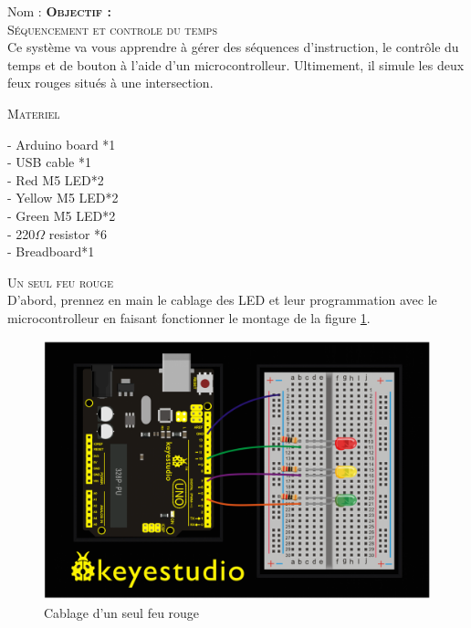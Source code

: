 \documentclass[a4paper, 11pt]{article}           %
\newcommand{\objectif}[1]{\textsc{\huge \textbf{Objectif :}\\[2mm] #1} }
\newcommand{\partie}[1]{\textsc{\LARGE #1} }
\begin{document}
\sffamily
\hfill Nom : {\noindent\makebox[5cm]{\dotfill}\endgraf}
\objectif{Séquencement et controle du temps}\\

Ce système va vous apprendre à gérer des séquences d'instruction, le contrôle du temps et de bouton à l'aide d'un microcontrolleur. Ultimement, il simule les deux feux rouges situés à une intersection.

\bigskip


\partie{Materiel}                         %
\begin{multicols}{2}
- Arduino board *1\\
- USB cable *1\\
- Red M5 LED*2\\
- Yellow M5 LED*2\\
- Green M5 LED*2\\
- 220$\Omega$ resistor *6\\
- Breadboard*1\\
\end{multicols}


\bigskip


\partie{Un seul feu rouge}\\             %
D'abord, prennez en main le cablage des LED et leur programmation avec le microcontrolleur en faisant fonctionner le montage de la figure \ref{UnFeuRouge}.

\begin{figure}[!b]
\begin{center}
\includegraphics[width=\textwidth]{UnFeuRouge}
\caption{Cablage d'un seul feu rouge}
\label{UnFeuRouge}
\end{center}
\end{figure}
\end{document}
